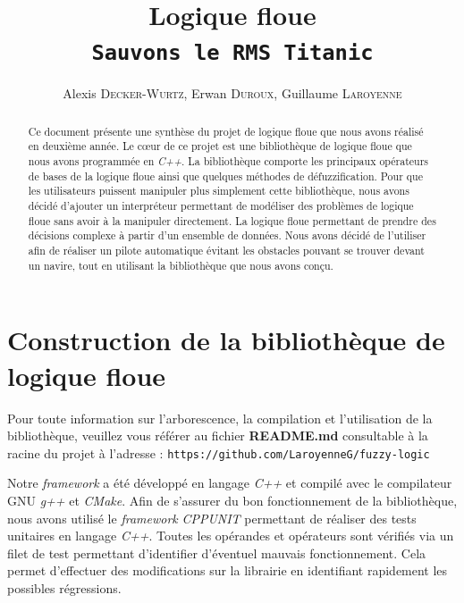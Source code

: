 \documentclass[a4paper,11pt]{article}
\title{\vspace*{3cm}Logique floue\\\texttt{Sauvons le RMS Titanic}}
\author{Alexis \textsc{Decker-Wurtz}, Erwan  \textsc{Duroux}, Guillaume  \textsc{Laroyenne}}
\begin{document}
    \maketitle

    \begin{abstract}


        \vspace*{2cm}
        
        Ce document présente une synthèse du projet de logique floue que nous avons réalisé en deuxième année.
        Le cœur de ce projet est une bibliothèque de logique floue que nous avons programmée en \textit{C++}. La bibliothèque comporte les principaux opérateurs de bases de la logique floue ainsi que quelques méthodes de défuzzification.
        Pour que les utilisateurs puissent manipuler plus simplement cette bibliothèque, nous avons décidé d'ajouter un interpréteur permettant de modéliser des problèmes de logique floue sans avoir à la manipuler directement.
        La logique floue permettant de prendre des décisions complexe à partir d'un ensemble de données. Nous avons décidé de l'utiliser afin de réaliser un pilote automatique évitant les obstacles pouvant se trouver devant un navire, tout en utilisant la bibliothèque que nous avons conçu.
    \end{abstract}

    \newpage

    \section{Construction de la bibliothèque de logique floue}

    \begin{center}
        Pour toute information sur l'arborescence, la compilation et l'utilisation de la bibliothèque, veuillez vous référer au fichier \textbf{README.md} consultable à la racine du projet à l’adresse : \texttt{https://github.com/LaroyenneG/fuzzy-logic}
    \end{center}

    Notre \textit{framework} a été développé en langage \textit{C++} et compilé avec le compilateur GNU \textit{g++} et \textit{CMake}.
    Afin de s’assurer du bon fonctionnement de la bibliothèque, nous avons utilisé le \textit{framework} \textit{CPPUNIT} permettant de réaliser des tests unitaires en langage \textit{C++}.
    Toutes les opérandes et opérateurs sont vérifiés via un filet de test permettant d’identifier d’éventuel mauvais fonctionnement.
    Cela permet d'effectuer des modifications sur la librairie en identifiant rapidement les possibles régressions.
\end{document}
